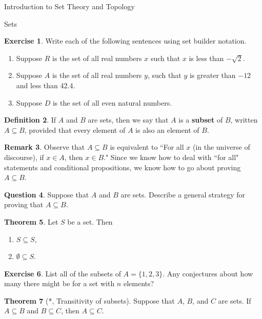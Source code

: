 \documentclass[11pt]{article}
\theoremstyle{definition}
\newtheorem{theorem}{Theorem}[section]
\newtheorem{definition}[theorem]{Definition}
\newtheorem{exercise}[theorem]{Exercise}
\newtheorem{remark}[theorem]{Remark}
\newtheorem{question}[theorem]{Question}
\begin{document}
\begin{section}{Introduction to Set Theory and Topology}
\begin{subsection}{Sets}
\begin{exercise}
Write each of the following sentences using set builder notation.
\begin{enumerate}
\item Suppose $R$ is the set of all real numbers $x$ such that $x$ is less than $-\sqrt{2}$. 
\item Suppose $A$ is the set of all real numbers $y$, such that $y$ is greater than $-12$ and less than 42.4.
\item Suppose $D$ is the set of all even natural numbers.
\end{enumerate}
\end{exercise}

\begin{definition}
If $A$ and $B$ are sets, then we say that $A$ is a \textbf{subset} of $B$, written $A\subseteq B$, provided that every element of $A$ is also an element of $B$.
\end{definition}

\begin{remark}
Observe that $A\subseteq B$ is equivalent to ``For all $x$ (in the universe of discourse), if $x\in A$, then $x\in B$."  Since we know how to deal with ``for all" statements and conditional propositions, we know how to go about proving $A\subseteq B$.
\end{remark}

\begin{question}
Suppose that $A$ and $B$ are sets.  Describe a general strategy for proving that $A\subseteq B$.
\end{question}

\begin{theorem}
Let $S$ be a set.  Then
\begin{enumerate}
\item $S\subseteq S$,
\item $\emptyset \subseteq S$.
\end{enumerate}
\end{theorem}

\begin{exercise}
List all of the subsets of $A=\{1,2,3\}$.  Any conjectures about how many there might be for a set with $n$ elements?
\end{exercise}

\begin{theorem}[*, Transitivity of subsets]
Suppose that $A$, $B$, and $C$ are sets.  If $A\subseteq B$ and $B\subseteq C$, then $A\subseteq C$.
\end{theorem}


\end{subsection}
\end{section}
\end{document}
